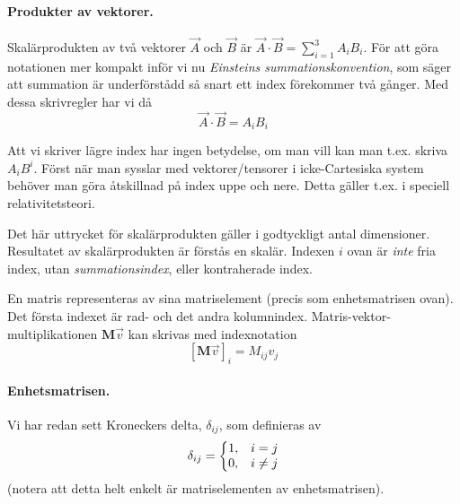 \documentclass[%
oneside,                 %
final,                   %
10pt]{article}
\newenvironment{notice_mdfboxadmon}[1][]{
\begin{notice_mdfboxmdframed}[frametitle=#1]
}
{
\end{notice_mdfboxmdframed}
}
\newenvironment{warning_mdfboxadmon}[1][]{
\begin{warning_mdfboxmdframed}[frametitle=#1]
}
{
\end{warning_mdfboxmdframed}
}
\begin{document}
\noindent
\paragraph{Produkter av vektorer.}
Skalärprodukten av två vektorer $\vec{A}$ och $\vec{B}$ är $\vec{A}\cdot\vec{B}=\sum_{i=1}^3A_iB_i$. För att göra notationen mer kompakt inför vi nu \emph{Einsteins summationskonvention}, som säger att summation är underförstådd så snart ett index förekommer två gånger. Med dessa skrivregler har vi då
\begin{equation}
\vec{A}\cdot\vec{B}=A_iB_i
\end{equation}

\begin{warning_mdfboxadmon}[Kommentar]
Att vi skriver lägre index har ingen betydelse, om man vill kan man t.ex. skriva $A_iB^i$. Först när man sysslar med vektorer/tensorer i icke-Cartesiska system behöver man göra åtskillnad på index uppe och nere. Detta gäller t.ex. i speciell relativitetsteori.
\end{warning_mdfboxadmon} %



Det här uttrycket för skalärprodukten gäller i godtyckligt antal dimensioner. Resultatet av skalärprodukten är förstås en skalär. Indexen $i$ ovan är \emph{inte} fria index, utan \emph{summationsindex}, eller kontraherade index. 


\begin{notice_mdfboxadmon}
En matris representeras av sina matriselement (precis som enhetsmatrisen ovan). Det första indexet är rad- och det andra kolumnindex. Matris-vektor-multiplikationen $\mathbf{M} \vec{v}$ kan skrivas med indexnotation
\begin{equation}
\left[ \mathbf{M} \vec{v} \right]_i = M_{ij} v_j
\end{equation}
\end{notice_mdfboxadmon} %



\paragraph{Enhetsmatrisen.}
Vi har redan sett Kroneckers delta, $\delta_{ij}$, som definieras av
\begin{equation}
\delta_{ij}=\left\{
\begin{matrix}
1,&i=j\cr
0,&i\neq j\cr
\end{matrix}
\right.
\end{equation}
(notera att detta helt enkelt är matriselementen av enhetsmatrisen).
\end{document}

